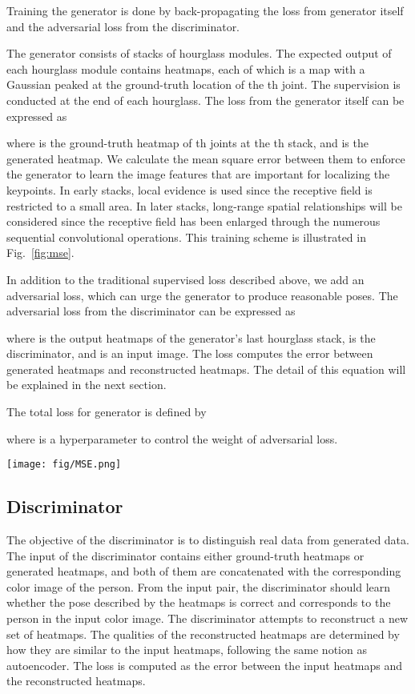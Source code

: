 \documentclass[10pt,twocolumn,letterpaper]{article}
\begin{document}
Training the generator is done by back-propagating the loss  from generator itself and the adversarial loss  from the discriminator. 

The generator consists of  stacks of hourglass modules. The expected output of each hourglass module contains  heatmaps, each of which is a  map with a Gaussian peaked at the ground-truth location of the th joint. The supervision is conducted at the end of each hourglass. The loss from the generator itself can be expressed as

where  is the ground-truth heatmap of th joints at the th stack, and  is the generated heatmap. We calculate the mean square error between them to enforce the generator to learn the image features that are important for localizing the keypoints. In early stacks, local evidence is used since the receptive field is restricted to a small area. In later stacks, long-range spatial relationships will be considered since the receptive field has been enlarged through the numerous sequential convolutional operations. This training scheme is illustrated in Fig.~\ref{fig:mse}.


In addition to the traditional supervised loss described above, we add an adversarial loss, which can urge the generator to produce reasonable poses. The adversarial loss from the discriminator can be expressed as

where  is the output heatmaps of the generator's last hourglass stack,  is the discriminator, and  is an input image. The loss computes the error between generated heatmaps and reconstructed heatmaps. The detail of this equation will be explained in the next section.

The total loss for generator is defined by 

where  is a hyperparameter to control the weight of adversarial loss.


\begin{figure*}[t]
	\centering
	\texttt{[image: fig/MSE.png]}
    \caption{An illustration of intermediate supervision. The mean squared error (MSE) loss is applied at the end of each hourglass module.}
    \label{fig:mse}
\end{figure*}


\subsection{Discriminator}

The objective of the discriminator is to distinguish real data from generated data. The input of the discriminator contains either ground-truth heatmaps or generated heatmaps, and both of them are concatenated with the corresponding color image of the person. From the input pair, the discriminator should learn whether the pose described by the heatmaps is correct and corresponds to the person in the input color image. The discriminator attempts to reconstruct a new set of heatmaps. The qualities of the reconstructed heatmaps are determined by how they are similar to the input heatmaps, following the same notion as autoencoder. The loss is computed as the error between the input heatmaps and the reconstructed heatmaps.
\end{document}
